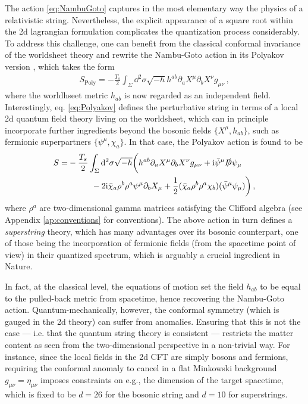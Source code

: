 The action \eqref{eq:NambuGoto} captures in the most elementary way the physics of a relativistic string. Nevertheless, the explicit appearance of a square root within the 2d lagrangian formulation complicates the quantization process considerably. To address this challenge, one can benefit from the classical conformal invariance of the worldsheet theory and rewrite the Nambu-Goto action in its Polyakov version \cite{Polyakov:1981rd}, which takes the form
%
\begin{align}\label{eq:Polyakov}
 S_{\text{Poly}} = -\frac{T_s}{2} \int_\Sigma \dd^2 \sigma \sqrt{-h} h^{ab} \partial_a X^{\mu} \partial_b X^{\nu} g_{\mu \nu}\, , 
\end{align}
%
where the worldhseet metric $h_{ab}$ is now regarded as an independent field. Interestingly, eq. \eqref{eq:Polyakov} defines the perturbative string in terms of a local 2d quantum field theory living on the worldsheet, which can in principle incorporate further ingredients beyond the bosonic fields $\{X^{\mu}, h_{ab} \}$, such as fermionic superpartners $\{\psi^{\mu}, \chi_a\}$. In that case, the Polyakov action is found to be
%
\begin{equation}\label{eq:Polyakovsuperstring}
	\begin{split}
		S = & - \frac{T_s}{2} \int_\Sigma {\rm d}^2 \sigma \sqrt{-h} \bigg(h^{ab} \partial_a X^\mu \partial_b X^\nu g_{\mu\nu} + \text{i} \bar{\psi}^\mu \slashed{D} \psi_\mu \\ & \hspace{1cm}- 2 \text{i} \bar{\chi}_a\rho^b\rho^a \psi^\mu \partial_b X_\mu  + \frac{1}{2}(\bar{\chi}_a\rho^b \rho^a \chi_b)(\bar{\psi}^\mu \psi_\mu)\bigg) \,,
	\end{split}
\end{equation}
%
where $\rho^a$ are two-dimensional gamma matrices satisfying the Clifford algebra (see Appendix \ref{ap:conventions} for conventions). The above action in turn defines a \emph{superstring} theory, which has many advantages over its bosonic counterpart, one of those being the incorporation of fermionic fields (from the spacetime point of view) in their quantized spectrum, which is arguably a crucial ingredient in Nature.

In fact, at the classical level, the equations of motion set the field $h_{ab}$ to be equal to the pulled-back metric from spacetime, hence recovering the Nambu-Goto action. Quantum-mechanically, however, the conformal symmetry (which is gauged in the 2d theory) can suffer from anomalies. Ensuring that this is not the case --- i.e. that the quantum string theory is consistent --- restricts the matter content as seen from the two-dimensional perspective in a non-trivial way. For instance, since the local fields in the 2d CFT are simply bosons and fermions, requiring the conformal anomaly to cancel in a flat Minkowski background $g_{\mu \nu} = \eta_{\mu \nu}$ imposes constraints on e.g., the dimension of the target spacetime, which is fixed to be $d=26$ for the bosonic string and $d=10$ for superstrings.

